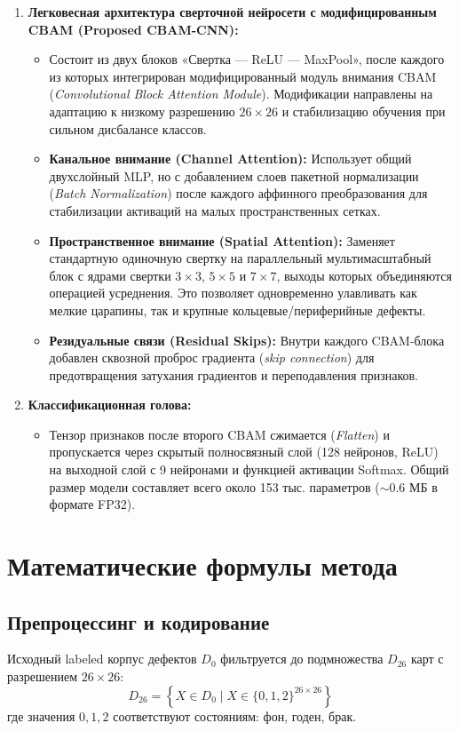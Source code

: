 \documentclass[11pt,a4paper]{article}
\begin{document}
\begin{enumerate}
    \item \textbf{Легковесная архитектура сверточной нейросети с модифицированным CBAM (Proposed CBAM-CNN):}
    \begin{itemize}
        \item Состоит из двух блоков «Свертка — ReLU — MaxPool», после каждого из которых интегрирован модифицированный модуль внимания CBAM (\textit{Convolutional Block Attention Module}). Модификации направлены на адаптацию к низкому разрешению $26 \times 26$ и стабилизацию обучения при сильном дисбалансе классов.
        \item \textbf{Канальное внимание (Channel Attention):} Использует общий двухслойный MLP, но с добавлением слоев пакетной нормализации (\textit{Batch Normalization}) после каждого аффинного преобразования для стабилизации активаций на малых пространственных сетках.
        \item \textbf{Пространственное внимание (Spatial Attention):} Заменяет стандартную одиночную свертку на параллельный мультимасштабный блок с ядрами свертки $3 \times 3$, $5 \times 5$ и $7 \times 7$, выходы которых объединяются операцией усреднения. Это позволяет одновременно улавливать как мелкие царапины, так и крупные кольцевые/периферийные дефекты.
        \item \textbf{Резидуальные связи (Residual Skips):} Внутри каждого CBAM-блока добавлен сквозной проброс градиента (\textit{skip connection}) для предотвращения затухания градиентов и переподавления признаков.
    \end{itemize}

    \item \textbf{Классификационная голова:}
    \begin{itemize}
        \item Тензор признаков после второго CBAM сжимается (\textit{Flatten}) и пропускается через скрытый полносвязный слой (128 нейронов, ReLU) на выходной слой с 9 нейронами и функцией активации Softmax. Общий размер модели составляет всего около 153 тыс. параметров ($\sim$0.6 МБ в формате FP32).
    \end{itemize}
\end{enumerate}

\section{Математические формулы метода}

\subsection{Препроцессинг и кодирование}
Исходный labeled корпус дефектов $D_0$ фильтруется до подмножества $D_{26}$ карт с разрешением $26 \times 26$:
\begin{equation}
D_{26} = \left\{ X \in D_0 \;\Big\vert\; X \in \{0, 1, 2\}^{26 \times 26} \right\}
\end{equation}
где значения $0, 1, 2$ соответствуют состояниям: фон, годен, брак.
\end{document}
